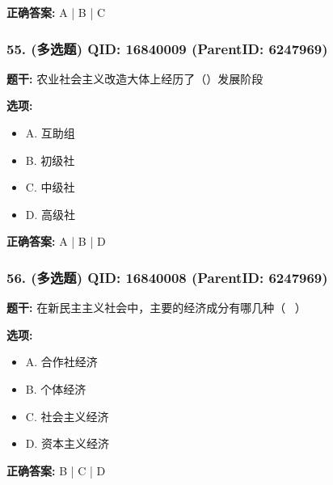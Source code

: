 \documentclass[12pt,UTF8]{ctexart}
\begin{document}
\textbf{正确答案:}
A | B | C

\vspace{0.3em}\hrulefill\vspace{0.7em}

\subsubsection*{55. (多选题) \small QID: 16840009 (ParentID: 6247969)}

\textbf{题干:}
农业社会主义改造大体上经历了（）发展阶段



\textbf{选项:}
\begin{itemize}[leftmargin=*]

  \item A. 互助组

  \item B. 初级社

  \item C. 中级社

  \item D. 高级社

\end{itemize}

\textbf{正确答案:}
A | B | D

\vspace{0.3em}\hrulefill\vspace{0.7em}

\subsubsection*{56. (多选题) \small QID: 16840008 (ParentID: 6247969)}

\textbf{题干:}
在新民主主义社会中，主要的经济成分有哪几种（  ）



\textbf{选项:}
\begin{itemize}[leftmargin=*]

  \item A. 合作社经济

  \item B. 个体经济

  \item C. 社会主义经济

  \item D. 资本主义经济

\end{itemize}

\textbf{正确答案:}
B | C | D
\end{document}
